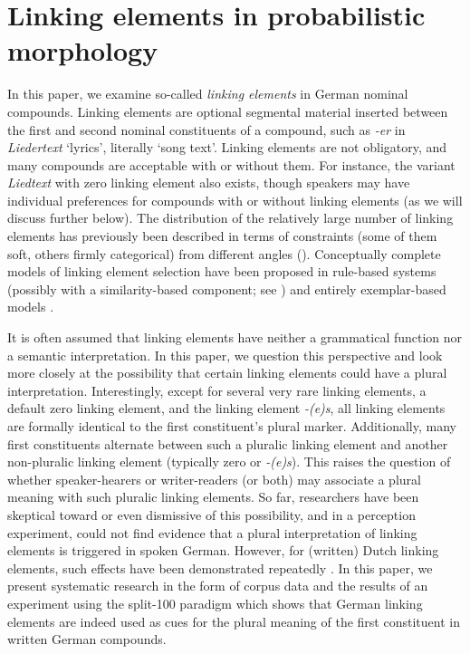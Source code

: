 \section{Linking elements in probabilistic morphology}
\label{sec:linkingelementsinprobabilisticmorphology}

In this paper, we examine so-called \textit{linking elements} in German nominal compounds.
Linking elements are optional segmental material inserted between the first and second nominal constituents of a compound, such as \textit{-er} in \textit{Liedertext} `lyrics', literally `song text'.
Linking elements are not obligatory, and many compounds are acceptable with or without them.
For instance, the variant \textit{Liedtext} with zero linking element also exists, though speakers may have individual preferences for compounds with or without linking elements (as we will discuss further below).
The distribution of the relatively large number of linking elements has previously been described in terms of constraints (some of them soft, others firmly categorical) from different angles (\eg \citealt{Fuhrhop1996,Wegener2003,Schluecker2012,NueblingSzczepaniak2013,FuhrhopKuerschner2015}).
Conceptually complete models of linking element selection have been proposed in rule-based systems (possibly with a similarity-based component; see \citealt{DresslerEa2001}) and entirely exemplar-based models \parencite{KrottEa2007}.

It is often assumed that linking elements have neither a grammatical function nor a semantic interpretation.
In this paper, we question this perspective and look more closely at the possibility that certain linking elements could have a plural interpretation.
Interestingly, except for several very rare linking elements, a default zero linking element, and the linking element \textit{-(e)s}, all linking elements are formally identical to the first constituent's plural marker.
Additionally, many first constituents alternate between such a pluralic linking element and another non-pluralic linking element (typically zero or \textit{-(e)s}).
This raises the question of whether speaker-hearers or writer-readers (or both) may associate a plural meaning with such pluralic linking elements.
So far, researchers have been skeptical toward or even dismissive of this possibility, and in a perception experiment, \textcite{KoesterEa2004} could not find evidence that a plural interpretation of linking elements is triggered in spoken German.
However, for (written) Dutch linking elements, such effects have been demonstrated repeatedly \parencite{SchreuderEa1998,BangaEa2012,BangaEa2013a,BangaEa2013b}.
In this paper, we present systematic research in the form of corpus data and the results of an experiment using the split-100 paradigm which shows that German linking elements are indeed used as cues for the plural meaning of the first constituent in written German compounds.

